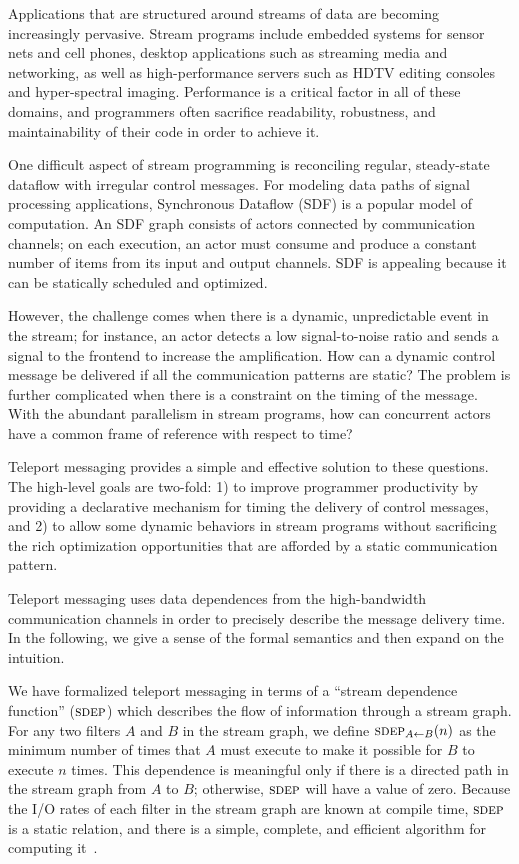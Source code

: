 \documentclass{csailabstractbook}
\begin{document}

Applications that are structured around streams of data are becoming
increasingly pervasive.  Stream programs include embedded systems for
sensor nets and cell phones, desktop applications such as streaming
media and networking, as well as high-performance servers such as HDTV
editing consoles and hyper-spectral imaging.  Performance is a
critical factor in all of these domains, and programmers often
sacrifice readability, robustness, and maintainability of their code
in order to achieve it.

One difficult aspect of stream programming is reconciling regular,
steady-state dataflow with irregular control messages.  For modeling
data paths of signal processing applications, Synchronous Dataflow
(SDF) is a popular model of computation.
An SDF graph consists of actors connected by communication channels;
on each execution, an actor must consume and produce a constant number
of items from its input and output channels.  SDF is appealing because
it can be statically scheduled and optimized.

However, the challenge comes when there is a dynamic, unpredictable
event in the stream; for instance, an actor detects a low
signal-to-noise ratio and sends a signal to the frontend to increase
the amplification.  How can a dynamic control message be delivered if
all the communication patterns are static?  The problem is further
complicated when there is a constraint on the timing of the message.
With the abundant parallelism in stream programs, how can concurrent
actors have a common frame of reference with respect to time?  

Teleport messaging provides a simple and effective solution to these
questions.  The high-level goals are two-fold: 1) to improve
programmer productivity by providing a declarative mechanism for
timing the delivery of control messages, and 2) to allow some dynamic
behaviors in stream programs without sacrificing the rich optimization
opportunities that are afforded by a static communication pattern.


Teleport messaging uses data dependences from the high-bandwidth
communication channels in order to precisely describe the message
delivery time.  In the following, we give a sense of the formal
semantics and then expand on the intuition.

We have formalized teleport messaging in terms of a ``stream
dependence function'' ($\textsc{sdep}$) which describes the flow of
information through a stream graph.  For any two filters $A$ and $B$
in the stream graph, we define $\textsc{sdep}_{A \small{\leftarrow}
B}(n)$ as the minimum number of times that $A$ must execute to make it
possible for $B$ to execute $n$ times.  This dependence is meaningful
only if there is a directed path in the stream graph from $A$ to $B$;
otherwise, $\textsc{sdep}$ will have a value of zero.  Because the I/O
rates of each filter in the stream graph are known at compile time,
$\textsc{sdep}$ is a static relation, and there is a simple, complete,
and efficient algorithm for computing it~\cite{sdep04}.
\end{document}
